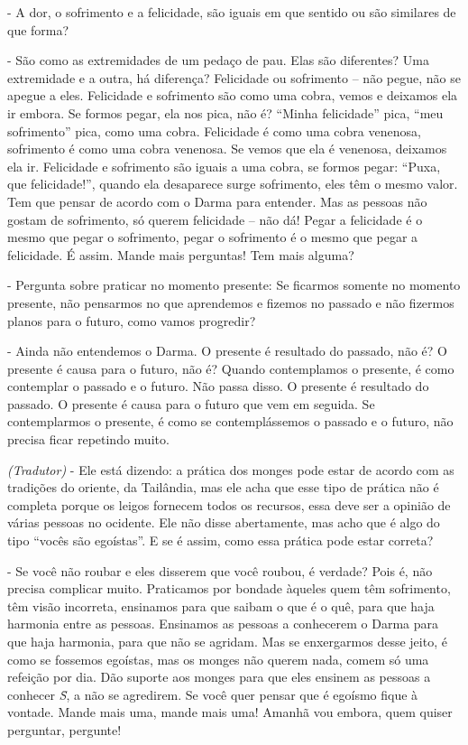{}- A dor, o sofrimento e a felicidade, são iguais em que sentido ou
são similares de que forma?

{}- São como as extremidades de um pedaço de pau. Elas são
diferentes? Uma extremidade e a outra, há diferença? Felicidade ou
sofrimento – não pegue, não se apegue a eles. Felicidade e sofrimento
são como uma cobra, vemos e deixamos ela ir embora. Se formos pegar,
ela nos pica, não é? “Minha felicidade” pica, “meu sofrimento” pica,
como uma cobra. Felicidade é como uma cobra venenosa, sofrimento é como
uma cobra venenosa. Se vemos que ela é venenosa, deixamos ela ir.
Felicidade e sofrimento são iguais a uma cobra, se formos pegar: “Puxa,
que felicidade!”, quando ela desaparece surge sofrimento, eles têm o
mesmo valor. Tem que pensar de acordo com o Darma para entender. Mas as
pessoas não gostam de sofrimento, só querem felicidade – não dá! Pegar
a felicidade é o mesmo que pegar o sofrimento, pegar o sofrimento é o
mesmo que pegar a felicidade. É assim. Mande mais perguntas! Tem mais
alguma?

{}- Pergunta sobre praticar no momento presente: Se ficarmos somente
no momento presente, não pensarmos no que aprendemos e fizemos no
passado e não fizermos planos para o futuro, como vamos progredir?

{}- Ainda não entendemos o Darma. O presente é resultado do passado,
não é? O presente é causa para o futuro, não é? Quando contemplamos o
presente, é como contemplar o passado e o futuro. Não passa disso. O
presente é resultado do passado. O presente é causa para o futuro que
vem em seguida. Se contemplarmos o presente, é como se contemplássemos
o passado e o futuro, não precisa ficar repetindo muito.

\textit{(Tradutor) }{}- Ele está dizendo: a prática dos monges pode
estar de acordo com as tradições do oriente, da Tailândia, mas ele acha
que esse tipo de prática não é completa porque os leigos fornecem todos
os recursos, essa deve ser a opinião de várias pessoas no ocidente. Ele
não disse abertamente, mas acho que é algo do tipo “vocês são
egoístas”. E se é assim, como essa prática pode estar correta?

{}- Se você não roubar e eles disserem que você roubou, é verdade?
Pois é, não precisa complicar muito. Praticamos por bondade àqueles
quem têm sofrimento, têm visão incorreta, ensinamos para que saibam o
que é o quê, para que haja harmonia entre as pessoas. Ensinamos as
pessoas a conhecerem o Darma para que haja harmonia, para que não se
agridam. Mas se enxergarmos desse jeito, é como se fossemos egoístas,
mas os monges não querem nada, comem só uma refeição por dia. Dão
suporte aos monges para que eles ensinem as pessoas a conhecer
\textit{S\=\ila}, a não se agredirem. Se você quer pensar que é egoísmo
fique à vontade. Mande mais uma, mande mais uma! Amanhã vou embora,
quem quiser perguntar, pergunte!

